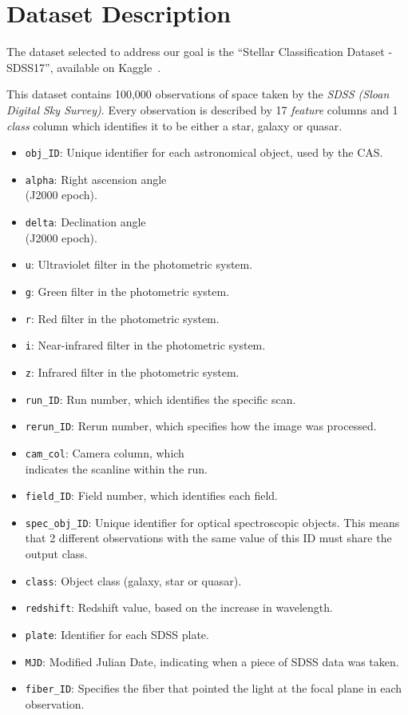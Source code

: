 \section{Dataset Description}
\label{sec:ds_desc}
The dataset selected to address our goal is the ``Stellar Classification Dataset - SDSS17'', available on Kaggle~\cite{kaggle}.

This dataset contains 100,000 observations of space taken by the \textit{SDSS (Sloan Digital Sky Survey)}. Every observation is described by 17 \textit{feature} columns and 1 \textit{class} column which identifies it to be either a star, galaxy or quasar.

 \begin{itemize}
    \item \texttt{obj\_ID}: Unique identifier for each astronomical object, used by the CAS.
    \item \texttt{alpha}: Right ascension angle \\(J2000 epoch).
    \item \texttt{delta}: Declination angle \\(J2000 epoch).
    \item \texttt{u}: Ultraviolet filter in the photometric system.
    \item \texttt{g}: Green filter in the photometric system.
    \item \texttt{r}: Red filter in the photometric system.
    \item \texttt{i}: Near-infrared filter in the photometric system.
    \item \texttt{z}: Infrared  filter in the photometric system.
    \item \texttt{run\_ID}: Run number, which identifies the specific scan.
    \item \texttt{rerun\_ID}: Rerun number, which specifies how the image was processed.
    \item \texttt{cam\_col}: Camera column, which\\indicates the scanline within the run.
    \item \texttt{field\_ID}: Field number, which identifies each field.
    \item \texttt{spec\_obj\_ID}: Unique identifier for optical spectroscopic objects. This means that 2 different observations with the same value of this ID must share the output class.
    \item \texttt{class}: Object class (galaxy, star or quasar).
    \item \texttt{redshift}: Redshift value, based on the increase in wavelength.
    \item \texttt{plate}: Identifier for each SDSS plate.
    \item \texttt{MJD}: Modified Julian Date, indicating when a piece of SDSS data was taken.
    \item \texttt{fiber\_ID}: Specifies the fiber that pointed the light at the focal plane in each observation.
\end{itemize}

